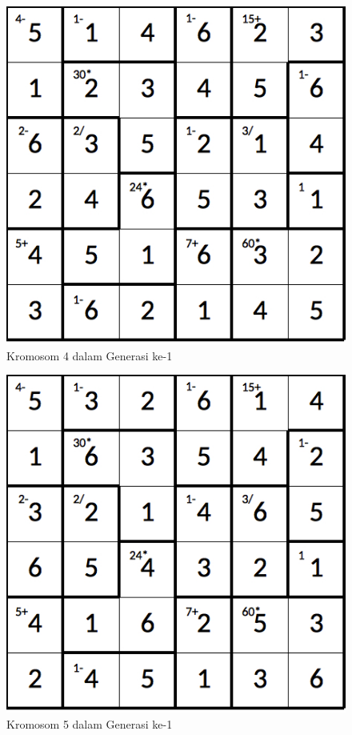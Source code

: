 \begin{figure}
\centering
\captionsetup{justification=centering}
\includegraphics[scale=0.333]{Gambar/hybridgenetic/Generation1Chromosome4}
\caption[Kromosom 4 dalam Generasi ke-1]{Kromosom 4 dalam Generasi ke-1}
\label{fig:analisisg1k4}
\end{figure}

\begin{figure}
\centering
\captionsetup{justification=centering}
\includegraphics[scale=0.333]{Gambar/hybridgenetic/Generation1Chromosome5}
\caption[Kromosom 5 dalam Generasi ke-1]{Kromosom 5 dalam Generasi ke-1}
\label{fig:analisisg1k5}
\end{figure}


